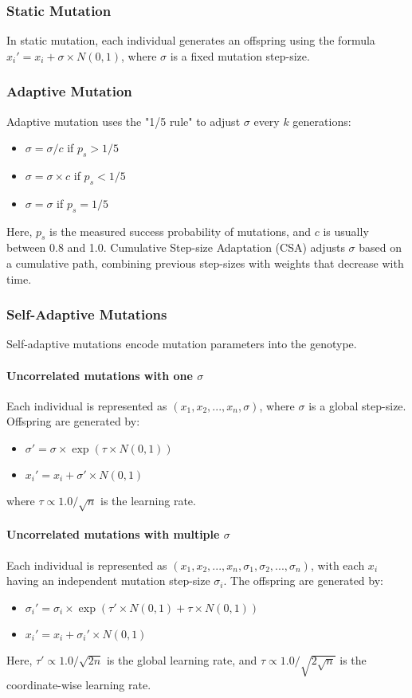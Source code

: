 \subsubsection*{Static Mutation}
In static mutation, each individual generates an offspring using the formula $x_i' = x_i + \sigma \times N(0,1)$, where $\sigma$ is a fixed mutation step-size.

\subsubsection*{Adaptive Mutation}
Adaptive mutation uses the "1/5 rule" to adjust $\sigma$ every $k$ generations:
\begin{itemize}
    \item $\sigma = \sigma / c$ if $p_s > 1/5$
    \item $\sigma = \sigma \times c$ if $p_s < 1/5$
    \item $\sigma = \sigma$ if $p_s = 1/5$
\end{itemize}
Here, $p_s$ is the measured success probability of mutations, and $c$ is usually between 0.8 and 1.0. Cumulative Step-size Adaptation (CSA) adjusts $\sigma$ based on a cumulative path, combining previous step-sizes with weights that decrease with time.

\subsubsection*{Self-Adaptive Mutations}
Self-adaptive mutations encode mutation parameters into the genotype.
\paragraph*{Uncorrelated mutations with one $\sigma$} Each individual is represented as $(x_1, x_2, ..., x_n, \sigma)$, where $\sigma$ is a global step-size. Offspring are generated by:
\begin{itemize}
    \item $\sigma' = \sigma \times \exp(\tau \times N(0,1))$
    \item $x_i' = x_i + \sigma' \times N(0,1)$
\end{itemize}
where $\tau \propto 1.0 / \sqrt{n}$ is the learning rate.
\paragraph*{Uncorrelated mutations with multiple $\sigma$} Each individual is represented as $(x_1, x_2, ..., x_n, \sigma_1, \sigma_2, ..., \sigma_n)$, with each $x_i$ having an independent mutation step-size $\sigma_i$. The offspring are generated by:
\begin{itemize}
    \item $\sigma_i' = \sigma_i \times \exp(\tau' \times N(0,1) + \tau \times N(0,1))$
    \item $x_i' = x_i + \sigma_i' \times N(0,1)$
\end{itemize}
Here, $\tau' \propto 1.0 / \sqrt{2n}$ is the global learning rate, and $\tau \propto 1.0 / \sqrt{2 \sqrt{n}}$ is the coordinate-wise learning rate.
